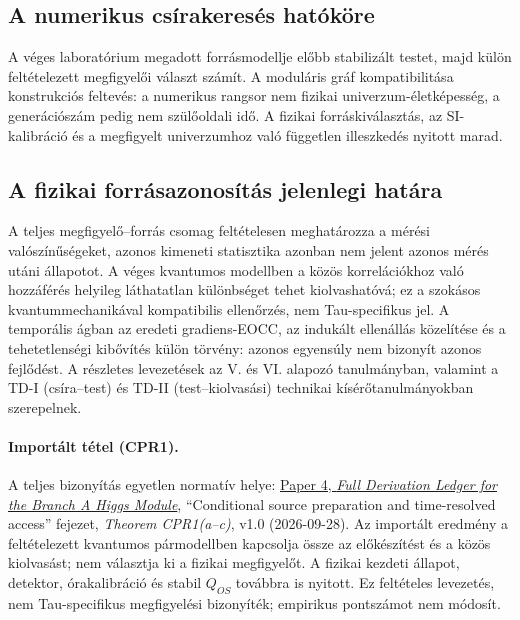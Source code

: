 \documentclass[12pt]{article}
\begin{document}
\subsection{A numerikus csírakeresés hatóköre}
A véges laboratórium megadott forrásmodellje előbb stabilizált testet, majd külön feltételezett megfigyelői választ számít. A moduláris gráf kompatibilitása konstrukciós feltevés: a numerikus rangsor nem fizikai univerzum-életképesség, a generációszám pedig nem szülőoldali idő. A fizikai forráskiválasztás, az SI-kalibráció és a megfigyelt univerzumhoz való független illeszkedés nyitott marad.

\subsection{A fizikai forrásazonosítás jelenlegi határa}
A teljes megfigyelő--forrás csomag feltételesen meghatározza a mérési valószínűségeket, azonos kimeneti statisztika azonban nem jelent azonos mérés utáni állapotot. A véges kvantumos modellben a közös korrelációkhoz való hozzáférés helyileg láthatatlan különbséget tehet kiolvashatóvá; ez a szokásos kvantummechanikával kompatibilis ellenőrzés, nem Tau-specifikus jel. A temporális ágban az eredeti gradiens-EOCC, az indukált ellenállás közelítése és a tehetetlenségi kibővítés külön törvény: azonos egyensúly nem bizonyít azonos fejlődést. A részletes levezetések az V. és VI. alapozó tanulmányban, valamint a TD-I (csíra--test) és TD-II (test--kiolvasási) technikai kísérőtanulmányokban szerepelnek.

\paragraph{Importált tétel (CPR1).}
A teljes bizonyítás egyetlen normatív helye: \href{https://github.com/tau-core-research/tau-core-higgs-module-paper4/blob/main/paper4_full_derivation/full_derivation.pdf#nameddest=cpr1}{Paper 4, \emph{Full Derivation Ledger for the Branch A Higgs Module}}, ``Conditional source preparation and time-resolved access'' fejezet, \emph{Theorem CPR1(a--c)}, v1.0 (2026-09-28). Az importált eredmény a feltételezett kvantumos pármodellben kapcsolja össze az előkészítést és a közös kiolvasást; nem választja ki a fizikai megfigyelőt. A fizikai kezdeti állapot, detektor, órakalibráció és stabil $Q_{OS}$ továbbra is nyitott. Ez feltételes levezetés, nem Tau-specifikus megfigyelési bizonyíték; empirikus pontszámot nem módosít.
\end{document}
